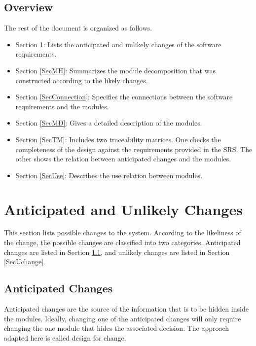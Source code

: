 \documentclass[12pt, titlepage]{article}
\begin{document}
\subsection{Overview}
The rest of the document is organized as follows. 
\begin{itemize}
  \item Section \ref{SecChange}: Lists the anticipated and unlikely changes of
  the software requirements.
  \item Section \ref{SecMH}: Summarizes the module decomposition that was
  constructed according to the likely changes.
  \item Section \ref{SecConnection}: Specifies the connections between the
  software requirements and the modules.
  \item Section \ref{SecMD}: Gives a detailed description of the modules.
  \item Section \ref{SecTM}: Includes two traceability matrices. One checks
  the completeness of the design against the requirements provided in the SRS.
  The other shows the relation between anticipated changes and the modules.
  \item Section \ref{SecUse}: Describes the use relation between modules.
\end{itemize}

\section{Anticipated and Unlikely Changes} \label{SecChange}

This section lists possible changes to the system. According to the likeliness
of the change, the possible changes are classified into two categories.
Anticipated changes are listed in Section \ref{SecAchange}, and unlikely
changes are listed in Section \ref{SecUchange}.

\subsection{Anticipated Changes} \label{SecAchange}
Anticipated changes are the source of the information that is to be hidden
inside the modules. Ideally, changing one of the anticipated changes will only
require changing the one module that hides the associated decision. The
approach adapted here is called design for change.
\end{document}
